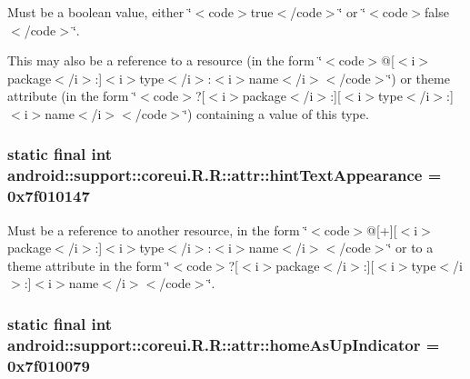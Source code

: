 Must be a boolean value, either \char`\"{}$<$code$>$true$<$/code$>$\char`\"{} or \char`\"{}$<$code$>$false$<$/code$>$\char`\"{}. 

This may also be a reference to a resource (in the form \char`\"{}$<$code$>$@\mbox{[}$<$i$>$package$<$/i$>$:\mbox{]}$<$i$>$type$<$/i$>$:$<$i$>$name$<$/i$>$$<$/code$>$\char`\"{}) or theme attribute (in the form \char`\"{}$<$code$>$?\mbox{[}$<$i$>$package$<$/i$>$:\mbox{]}\mbox{[}$<$i$>$type$<$/i$>$:\mbox{]}$<$i$>$name$<$/i$>$$<$/code$>$\char`\"{}) containing a value of this type. \hypertarget{classandroid_1_1support_1_1coreui_1_1_r_1_1attr_4f097527c8f166865ad4dd1c4ab7c9ff}{
\subsubsection[{hintTextAppearance}]{\setlength{\rightskip}{0pt plus 5cm}static final int android::support::coreui.R.R::attr::hintTextAppearance = 0x7f010147}}
\label{classandroid_1_1support_1_1coreui_1_1_r_1_1attr_4f097527c8f166865ad4dd1c4ab7c9ff}


Must be a reference to another resource, in the form \char`\"{}$<$code$>$@\mbox{[}+\mbox{]}\mbox{[}$<$i$>$package$<$/i$>$:\mbox{]}$<$i$>$type$<$/i$>$:$<$i$>$name$<$/i$>$$<$/code$>$\char`\"{} or to a theme attribute in the form \char`\"{}$<$code$>$?\mbox{[}$<$i$>$package$<$/i$>$:\mbox{]}\mbox{[}$<$i$>$type$<$/i$>$:\mbox{]}$<$i$>$name$<$/i$>$$<$/code$>$\char`\"{}. \hypertarget{classandroid_1_1support_1_1coreui_1_1_r_1_1attr_d0c716d6b3d380ecaff0679312f2191a}{
\subsubsection[{homeAsUpIndicator}]{\setlength{\rightskip}{0pt plus 5cm}static final int android::support::coreui.R.R::attr::homeAsUpIndicator = 0x7f010079}}
\label{classandroid_1_1support_1_1coreui_1_1_r_1_1attr_d0c716d6b3d380ecaff0679312f2191a}


